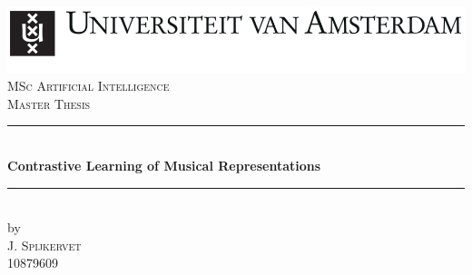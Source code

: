 \begin{titlepage}
    \begin{fullwidth}
        \newcommand{\HRule}{\rule{\linewidth}{0.5mm}} %
        \center %
        
        
        \includegraphics[width=\linewidth]{images/uva.jpeg}\\[2.5cm]
        \textsc{\Large MSc Artificial Intelligence}\\[0.2cm]
        \textsc{\Large Master Thesis}\\[0.5cm] 
        
        
        \HRule \\[0.4cm]
        { \huge \bfseries Contrastive Learning of Musical Representations}\\[0.4cm] %
        \HRule \\[0.5cm]
        
        
        by\\[0.2cm]
        \textsc{\Large J. Spijkervet}\\[0.2cm] %
        10879609\\[1cm]
        
        
        

\end{fullwidth}
\end{titlepage}
